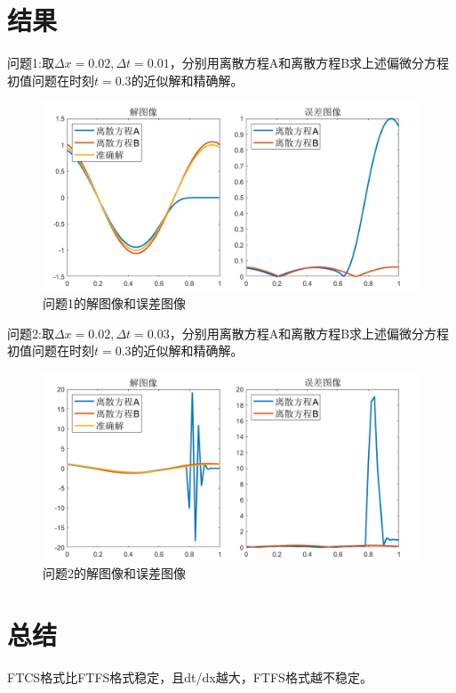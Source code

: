 \documentclass{article}
\begin{document}
\section{结果}
问题1:取$\Delta x=0.02, \Delta t=0.01$，分别用离散方程A和离散方程B求上述偏微分方程初值问题在时刻$t=0.3$的近似解和精确解。\par
\begin{figure}[htbp]
    \centering
    \caption{问题1的解图像和误差图像}
    \includegraphics[width=\textwidth]{问题1.png}
\end{figure}
问题2:取$\Delta x=0.02, \Delta t=0.03$，分别用离散方程A和离散方程B求上述偏微分方程初值问题在时刻$t=0.3$的近似解和精确解。\par
\begin{figure}[htbp]
    \centering
    \caption{问题2的解图像和误差图像}
    \includegraphics[width=\textwidth]{问题2.png}
\end{figure}

\section{总结}
FTCS格式比FTFS格式稳定，且dt/dx越大，FTFS格式越不稳定。
\end{document}
